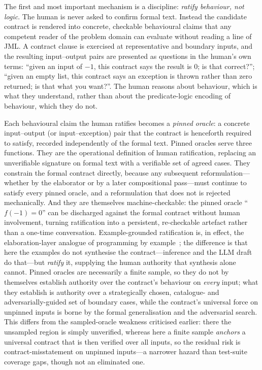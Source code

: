 The first and most important mechanism is a discipline: \emph{ratify behaviour, not logic}. The human is never asked to confirm formal text. Instead the candidate contract is rendered into concrete, checkable behavioural claims that any competent reader of the problem domain can evaluate without reading a line of JML. A contract clause is exercised at representative and boundary inputs, and the resulting input--output pairs are presented as questions in the human's own terms: ``given an input of $-1$, this contract says the result is $0$; is that correct?''; ``given an empty list, this contract says an exception is thrown rather than zero returned; is that what you want?''. The human reasons about behaviour, which is what they understand, rather than about the predicate-logic encoding of behaviour, which they do not.

Each behavioural claim the human ratifies becomes a \emph{pinned oracle}: a concrete input--output (or input--exception) pair that the contract is henceforth required to satisfy, recorded independently of the formal text. Pinned oracles serve three functions. They are the operational definition of human ratification, replacing an unverifiable signature on formal text with a verifiable set of agreed cases. They constrain the formal contract directly, because any subsequent reformulation---whether by the elaborator or by a later compositional pass---must continue to satisfy every pinned oracle, and a reformulation that does not is rejected mechanically. And they are themselves machine-checkable: the pinned oracle ``$f(-1)=0$'' can be discharged against the formal contract without human involvement, turning ratification into a persistent, re-checkable artefact rather than a one-time conversation. Example-grounded ratification is, in effect, the elaboration-layer analogue of programming by example~\cite{gulwani2011flashfill}; the difference is that here the examples do not synthesise the contract---inference and the LLM draft do that---but \emph{ratify} it, supplying the human authority that synthesis alone cannot. Pinned oracles are necessarily a finite sample, so they do not by themselves establish authority over the contract's behaviour on \emph{every} input; what they establish is authority over a strategically chosen, catalogue- and adversarially-guided set of boundary cases, while the contract's universal force on unpinned inputs is borne by the formal generalisation and the adversarial search. This differs from the sampled-oracle weakness criticised earlier: there the unsampled region is simply unverified, whereas here a finite sample \emph{anchors} a universal contract that is then verified over all inputs, so the residual risk is contract-misstatement on unpinned inputs---a narrower hazard than test-suite coverage gaps, though not an eliminated one.

